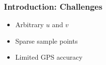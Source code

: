 \documentclass{beamer}
\theoremstyle{definition}
\begin{document}
\begin{frame}
\frametitle{Introduction: Challenges}
\begin{itemize}
	\item <1-> Arbitrary $u$ and $v$
	\item <2-> Sparse sample points
	\item <3-> Limited GPS accuracy
\end{itemize}

\begin{figure}
\centering
{}
\end{figure}
\end{frame}
\end{document}
